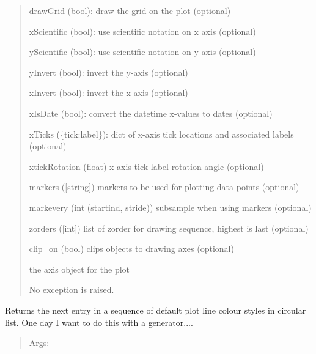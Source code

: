 \documentclass[a4paper,10pt,english]{sphinxmanual}
\begin{document}
\begin{fulllineitems}
\begin{fulllineitems}
\begin{quote}
\begin{description}
\begin{DUlineblock}{0em}
\item[] drawGrid (bool): draw the grid on the plot (optional)
\item[] xScientific (bool): use scientific notation on x axis (optional)
\item[] yScientific (bool): use scientific notation on y axis (optional)
\item[] yInvert (bool): invert the y-axis (optional)
\item[] xInvert (bool): invert the x-axis (optional)
\item[] xIsDate (bool): convert the datetime x-values to dates (optional)
\item[] xTicks (\{tick:label\}): dict of x-axis tick locations and associated labels (optional)
\item[] xtickRotation (float) x-axis tick label rotation angle (optional) 
\item[] markers ({[}string{]}) markers to be used for plotting data points (optional)
\item[] markevery (int \textbar{} (startind, stride)) subsample when using markers (optional)
\item[] zorders ({[}int{]}) list of zorder for drawing sequence, highest is last (optional)
\item[] clip\_on (bool) clips objects to drawing axes (optional)
\end{DUlineblock}

\item[{Returns:}] \leavevmode
\begin{DUlineblock}{0em}
\item[] the axis object for the plot
\end{DUlineblock}

\item[{Raises:}] \leavevmode
\begin{DUlineblock}{0em}
\item[] No exception is raised.
\end{DUlineblock}

\end{description}
\end{quote}

\end{fulllineitems}


\begin{fulllineitems}
\label{ryplot:pyradi.ryplot.Plotter.nextPlotCol}
Returns the next entry in a sequence of default
plot line colour styles in circular list.
One day I want to do this with a generator....
\begin{quote}
\begin{description}
\item[{Args:}] \leavevmode
{}


\end{description}
\end{quote}
\end{fulllineitems}
\end{fulllineitems}
\end{document}

